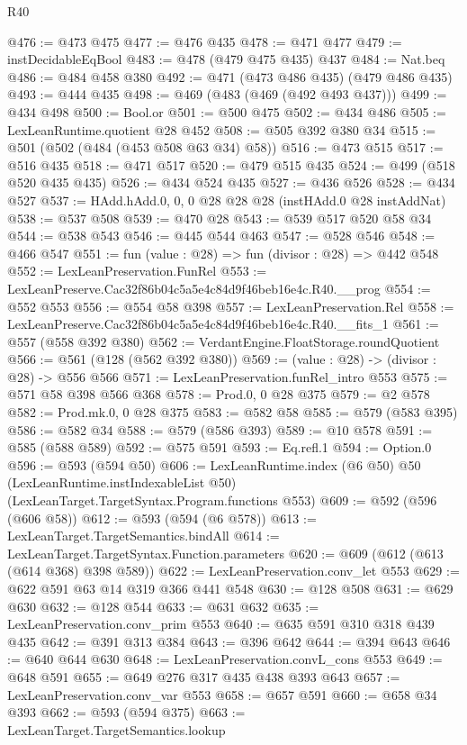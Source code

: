 \begin{lexlean}{R40}
\begin{coremodule}
@476 := @473 @475
@477 := @476 @435
@478 := @471 @477
@479 := instDecidableEqBool
@483 := @478 (@479 @475 @435) @437
@484 := Nat.beq
@486 := @484 @458 @380
@492 := @471 (@473 @486 @435) (@479 @486 @435)
@493 := @444 @435
@498 := @469 (@483 (@469 (@492 @493 @437)))
@499 := @434 @498
@500 := Bool.or
@501 := @500 @475
@502 := @434 @486
@505 := LexLeanRuntime.quotient @28 @452
@508 := @505 @392 @380 @34
@515 := @501 (@502 (@484 (@453 @508 @63 @34) @58))
@516 := @473 @515
@517 := @516 @435
@518 := @471 @517
@520 := @479 @515 @435
@524 := @499 (@518 @520 @435 @435)
@526 := @434 @524 @435
@527 := @436 @526
@528 := @434 @527
@537 := HAdd.hAdd.{0, 0, 0} @28 @28 @28 (instHAdd.{0} @28 instAddNat)
@538 := @537 @508
@539 := @470 @28
@543 := @539 @517 @520 @58 @34
@544 := @538 @543
@546 := @445 @544 @463
@547 := @528 @546
@548 := @466 @547
@551 := fun (value : @28) => fun (divisor : @28) => @442 @548
@552 := LexLeanPreservation.FunRel
@553 := LexLeanPreserve.Cac32f86b04c5a5e4c84d9f46beb16e4c.R40.__prog
@554 := @552 @553
@556 := @554 @58 @398
@557 := LexLeanPreservation.Rel
@558 := LexLeanPreserve.Cac32f86b04c5a5e4c84d9f46beb16e4c.R40.__fits_1
@561 := @557 (@558 @392 @380)
@562 := VerdantEngine.FloatStorage.roundQuotient
@566 := @561 (@128 (@562 @392 @380))
@569 := (value : @28) -> (divisor : @28) -> @556 @566
@571 := LexLeanPreservation.funRel_intro @553
@575 := @571 @58 @398 @566 @368
@578 := Prod.{0, 0} @28 @375
@579 := @2 @578
@582 := Prod.mk.{0, 0} @28 @375
@583 := @582 @58
@585 := @579 (@583 @395)
@586 := @582 @34
@588 := @579 (@586 @393)
@589 := @10 @578
@591 := @585 (@588 @589)
@592 := @575 @591
@593 := Eq.refl.{1}
@594 := Option.{0}
@596 := @593 (@594 @50)
@606 := LexLeanRuntime.index
    (@6 @50)
    @50
    (LexLeanRuntime.instIndexableList @50)
    (LexLeanTarget.TargetSyntax.Program.functions @553)
@609 := @592 (@596 (@606 @58))
@612 := @593 (@594 (@6 @578))
@613 := LexLeanTarget.TargetSemantics.bindAll
@614 := LexLeanTarget.TargetSyntax.Function.parameters
@620 := @609 (@612 (@613 (@614 @368) @398 @589))
@622 := LexLeanPreservation.conv_let @553
@629 := @622 @591 @63 @14 @319 @366 @441 @548
@630 := @128 @508
@631 := @629 @630
@632 := @128 @544
@633 := @631 @632
@635 := LexLeanPreservation.conv_prim @553
@640 := @635 @591 @310 @318 @439 @435
@642 := @391 @313 @384
@643 := @396 @642
@644 := @394 @643
@646 := @640 @644 @630
@648 := LexLeanPreservation.convL_cons @553
@649 := @648 @591
@655 := @649 @276 @317 @435 @438 @393 @643
@657 := LexLeanPreservation.conv_var @553
@658 := @657 @591
@660 := @658 @34 @393
@662 := @593 (@594 @375)
@663 := LexLeanTarget.TargetSemantics.lookup

\end{coremodule}
\end{lexlean}
